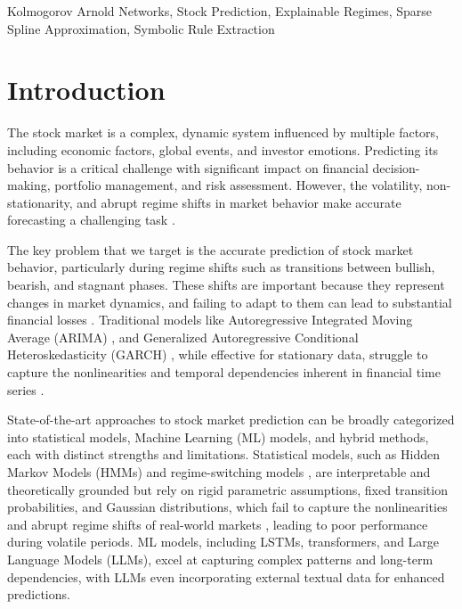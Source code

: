 \documentclass[conference,10pt]{IEEEtran}
\begin{document}
\begin{IEEEkeywords}
Kolmogorov Arnold Networks, Stock Prediction, Explainable Regimes, Sparse Spline Approximation, Symbolic Rule Extraction 
\end{IEEEkeywords}



\section{Introduction}

The stock market is a complex, dynamic system influenced by multiple factors, including economic factors, global events, and investor emotions. Predicting its behavior is a critical challenge with significant impact on financial decision-making, portfolio management, and risk assessment. However, the volatility, non-stationarity, and abrupt regime shifts in market behavior make accurate forecasting a challenging task \cite{10142717}.

The key problem that we target is the accurate prediction of stock market behavior, particularly during regime shifts such as transitions between bullish, bearish, and stagnant phases. These shifts are important because they represent changes in market dynamics, and failing to adapt to them can lead to substantial financial losses
\cite{kokare2022study}. Traditional models like Autoregressive Integrated Moving Average (ARIMA) \cite{ho1998use}, and Generalized Autoregressive Conditional Heteroskedasticity (GARCH) \cite{bauwens2006multivariate}, while effective for stationary data, struggle to capture the nonlinearities and temporal dependencies inherent in financial time series \cite{alkhfajee2024advancements,crawford2003assessing}.   

State-of-the-art approaches to stock market prediction can be broadly categorized into statistical models, Machine Learning (ML) models, and hybrid methods, each with distinct strengths and limitations. Statistical models, such as Hidden Markov Models (HMMs) and regime-switching models \cite{yuan2016market}, are interpretable and theoretically grounded but rely on rigid parametric assumptions, fixed transition probabilities, and Gaussian distributions, which fail to capture the nonlinearities and abrupt regime shifts of real-world markets \cite{wkatorek2021financial}, leading to poor performance during volatile periods. ML models, including LSTMs, transformers, and Large Language Models (LLMs), excel at capturing complex patterns and long-term dependencies, with LLMs even incorporating external textual data for enhanced predictions. 
\end{document}
